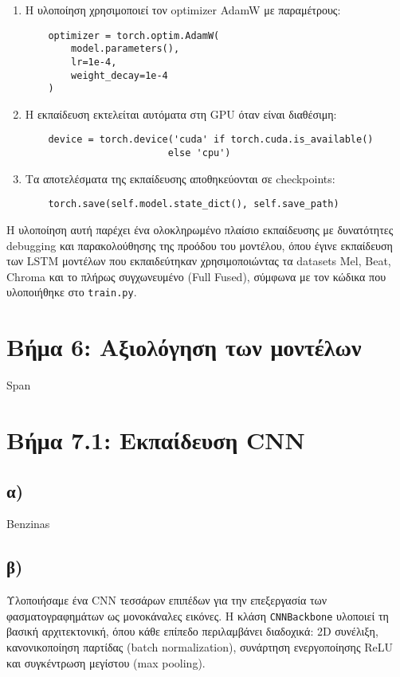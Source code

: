 \documentclass[a4paper,12pt]{article}
\begin{document}
\begin{enumerate}
    \item Η υλοποίηση χρησιμοποιεί τον optimizer AdamW με παραμέτρους:
    \begin{verbatim}
    optimizer = torch.optim.AdamW(
        model.parameters(), 
        lr=1e-4, 
        weight_decay=1e-4
    )
    \end{verbatim}

    \item Η εκπαίδευση εκτελείται αυτόματα στη GPU όταν είναι διαθέσιμη:
    \begin{verbatim}
    device = torch.device('cuda' if torch.cuda.is_available() 
                         else 'cpu')
    \end{verbatim}

    \item Τα αποτελέσματα της εκπαίδευσης αποθηκεύονται σε checkpoints:
    \begin{verbatim}
    torch.save(self.model.state_dict(), self.save_path)
    \end{verbatim}
\end{enumerate}

Η υλοποίηση αυτή παρέχει ένα ολοκληρωμένο πλαίσιο εκπαίδευσης με δυνατότητες debugging και παρακολούθησης της προόδου του μοντέλου,
όπου έγινε εκπαίδευση των LSTM μοντέλων που εκπαιδεύτηκαν χρησιμοποιώντας τα datasets Mel, Beat, Chroma και το πλήρως συγχωνευμένο (Full Fused), σύμφωνα με τον κώδικα που υλοποιήθηκε στο \verb|train.py|.

\section*{Βήμα 6: Αξιολόγηση των μοντέλων}

Span

\section*{Βήμα 7.1: Εκπαίδευση CNN}

\subsection*{α)}

Benzinas

\subsection*{β)}

Υλοποιήσαμε ένα CNN τεσσάρων επιπέδων για την επεξεργασία των φασματογραφημάτων ως μονοκάναλες εικόνες. Η κλάση \texttt{CNNBackbone} υλοποιεί τη βασική αρχιτεκτονική, όπου κάθε επίπεδο περιλαμβάνει διαδοχικά: 2D συνέλιξη, κανονικοποίηση παρτίδας (batch normalization), συνάρτηση ενεργοποίησης ReLU και συγκέντρωση μεγίστου (max pooling).
\end{document}
